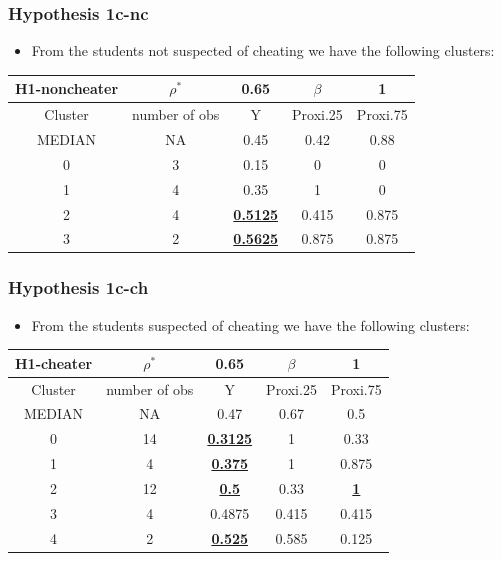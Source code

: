 \documentclass{beamer} %
\theoremstyle{definition}
\begin{document}
	\begin{frame}
		\frametitle{Hypothesis 1c-nc}
		\centering
		\begin{itemize}
			\item From the students not suspected of cheating we have the following clusters:
		\end{itemize}
		\begin{table}
			\small
			\begin{tabular}{|c|c|c|c|c|}
				\hline
				H1-noncheater & $\rho^*$ & 0.65 & $\beta$ & 1 \\
				\hline
				Cluster & number of obs & Y & Proxi.25 & Proxi.75 \\
				\hline
				MEDIAN & NA & 0.45 & 0.42 & 0.88 \\
				\hline
				0 & 3 & 0.15 & 0 & 0 \\
				1 & 4 & 0.35 & 1 & 0 \\
				2 & 4 & \underline{\textbf{0.5125}} & 0.415 & 0.875 \\
				3 & 2 &\underline{\textbf{0.5625}} & 0.875 & 0.875 \\
				\hline
			\end{tabular}
		\end{table}
	\end{frame}
	
	\begin{frame}
		\frametitle{Hypothesis 1c-ch}
		\centering
		\begin{itemize}
			\item From the students suspected of cheating we have the following clusters:
		\end{itemize}
		\begin{table}
			\small
			\begin{tabular}{|c|c|c|c|c|}
				\hline
				H1-cheater & $\rho^*$ & 0.65 & $\beta$ & 1 \\
				\hline
				Cluster & number of obs & Y & Proxi.25 & Proxi.75 \\
				\hline
				MEDIAN & NA & 0.47 & 0.67 & 0.5 \\
				\hline
				0 & 14 &\underline{\textbf{0.3125}} & 1 & 0.33 \\
				1 & 4 & \underline{\textbf{0.375}} & 1 & 0.875 \\
				2 & 12 &\underline{\textbf{0.5}} & 0.33 & \underline{\textbf{1}} \\
				3 & 4 & 0.4875 & 0.415 & 0.415 \\
				4 & 2 & \underline{\textbf{0.525}} & 0.585 & 0.125 \\
				\hline
			\end{tabular}
		\end{table}
	\end{frame}
	
\end{document}
